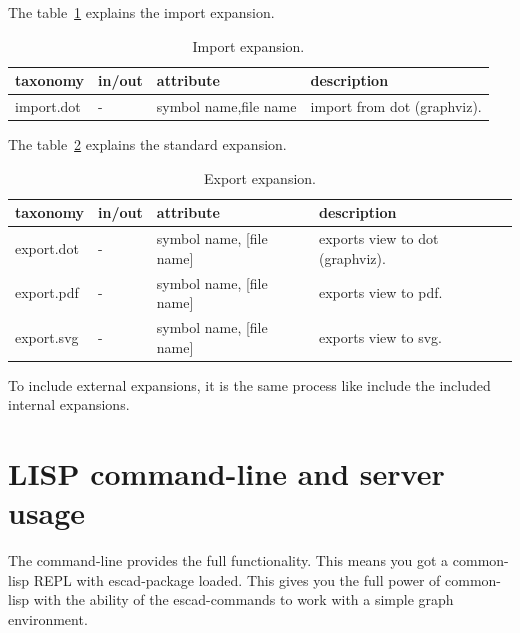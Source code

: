 \documentclass[a4paper, 12pt, openany]{scrbook}
\begin{document}
The table~\ref{tab:import-expansion} explains the import expansion.
\begin{table}[htbp]
\centering
\begin{tabular}{|p{3.5cm}|p{4cm}|p{4cm}|p{4cm}|}
  \hline
  \textbf{taxonomy} & \textbf{in/out} & \textbf{attribute} & \textbf{description} \\
  \hline
  import.dot & - & symbol name,\newline file name & import from dot (graphviz). \\
  \hline
\end{tabular}
\caption{Import expansion.}
\label{tab:import-expansion}
\end{table}

The table~\ref{tab:export-expansion} explains the standard expansion.
\begin{table}[htbp]
\centering
\begin{tabular}{|p{3.5cm}|p{4cm}|p{4cm}|p{4cm}|}
  \hline
  \textbf{taxonomy} & \textbf{in/out} & \textbf{attribute} & \textbf{description} \\
  \hline
  export.dot & - & symbol name, [file name] & exports view to dot (graphviz). \\
  \hline
  export.pdf & - & symbol name, [file name] & exports view to pdf. \\
  \hline
  export.svg & - & symbol name, [file name] & exports view to svg. \\
  \hline
\end{tabular}
\caption{Export expansion.}
\label{tab:export-expansion}
\end{table}
To include external expansions, it is the same process like include the included internal expansions.
\section{LISP command-line and server usage}\label{sec:cmd_line}
The command-line provides the full functionality. This means you got a common-lisp REPL with escad-package loaded. This gives you the full power of common-lisp with the ability of the escad-commands to work with a simple graph environment.
\end{document}
